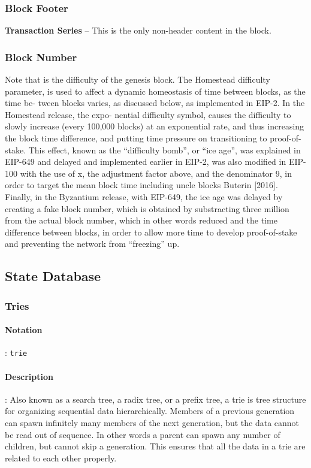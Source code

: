 \documentclass[10pt,a4paper,leqno,bibliography=totoc]{scrartcl}
\newenvironment{alphafootnotes}
{\par\edef\savedfootnotenumber{\number\value{footnote}}
\renewcommand{\thefootnote}{\alph{footnote}}
\setcounter{footnote}{0}}
{\par\setcounter{footnote}{\savedfootnotenumber}}
\begin{document}
\begin{alphafootnotes}
\begin{multicols*}{2}
\begin{enumerate}
					\end{enumerate}
				
					\subsubsection{Block Footer}
					\item \textbf{Transaction Series} -- This is the only non-header content in the block.
					
					\subsubsection{Block Number}
						Note that is the difficulty of the genesis block. The Homestead difficulty parameter, is used to affect a dynamic homeostasis of time between blocks, as the time be- tween blocks varies, as discussed below, as implemented in EIP-2. In the Homestead release, the expo- nential difficulty symbol, causes the difficulty to slowly increase (every 100,000 blocks) at an exponential rate, and thus increasing the block time difference, and putting time pressure on transitioning to proof-of-stake. This effect, known as the “difficulty bomb”, or “ice age”, was explained in EIP-649 and delayed and implemented earlier in EIP-2, was also modified in EIP-100 with the use of x, the adjustment factor above, and the denominator 9, in order to target the mean block time including uncle blocks Buterin [2016]. Finally, in the Byzantium release, with EIP-649, the ice age was delayed by creating a fake block number, which is obtained by substracting three million from the actual block number, which in other words reduced and the time difference between blocks, in order to allow more time to develop proof-of-stake and preventing the network from “freezing” up.\supercite{Wood2017}
			

		\subsection{State Database}

		\subsubsection{Tries}
		\paragraph{Notation}: \texttt{trie}
		\paragraph{Description}: Also known as a search tree, a radix  tree, or a prefix tree, a trie is tree structure for organizing sequential data hierarchically. Members of a previous generation can spawn infinitely many members of the next generation, but the data cannot be read out of sequence. In other words a parent can spawn any number of children, but cannot skip a generation. This ensures that all the data in a trie are related to each other properly. 
		

\end{multicols*}
\end{alphafootnotes}
\end{document}
